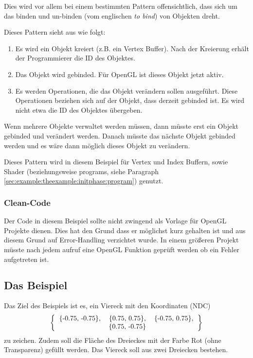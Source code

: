 Dies wird vor allem bei einem bestimmten Pattern offensichtlich, dass sich um das binden und un-binden (vom englischen \textit{to bind}) von Objekten dreht.

Dieses Pattern sieht aus wie folgt:
\begin{enumerate}
    \item Es wird ein Objekt kreiert (z.B. ein Vertex Buffer). Nach der Kreierung erhält der Programmierer die ID des Objektes.
    \item Das Objekt wird gebinded. Für OpenGL ist dieses Objekt jetzt aktiv.
    \item Es werden Operationen, die das Objekt verändern sollen ausgeführt. Diese Operationen beziehen sich auf der Objekt, dass derzeit gebinded ist. Es wird nicht etwa die ID des Objektes übergeben.
\end{enumerate}

Wenn mehrere Objekte verwaltet werden müssen, dann müsste erst ein Objekt gebinded und verändert werden. Danach müsste das nächste Objekt gebinded werden und es wäre dann möglich dieses Objekt zu verändern.

Dieses Pattern wird in diesem Beispiel für Vertex und Index Buffern, sowie Shader (beziehungsweise programs, siehe Paragraph \ref{sec:example:theexample:initphase:program}) genutzt.

\subsubsection{Clean-Code}
Der Code in diesem Beispiel sollte nicht zwingend als Vorlage für OpenGL Projekte dienen. Dies hat den Grund dass er möglichst kurz gehalten ist und aus diesem Grund auf Error-Handling verzichtet wurde. In einem größeren Projekt müsste nach jedem aufruf eine OpenGL Funktion geprüft werden ob ein Fehler aufgetreten ist. 

\subsection{Das Beispiel}
Das Ziel des Beispiels ist es, ein Viereck mit den Koordinaten (NDC)
$$
    \left\{
    \begin{tabular}{ccc}
        \{-0.75, -0.75\}, & \{0.75, 0.75\}, & \{-0.75, 0.75\}, \\ 
                          & \{0.75, -0.75\} &
    \end{tabular}    
    \right\}
$$
zu zeichen. Zudem soll die Fläche des Dreieckes mit der Farbe Rot (ohne Transparenz) gefüllt werden. Das Viereck soll aus zwei Dreiecken bestehen.

